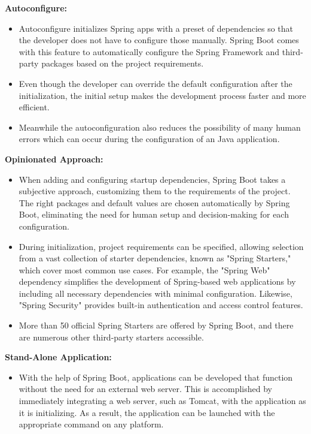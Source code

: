     \textbf{Autoconfigure:}
        \begin{itemize}
            \item Autoconfigure initializes Spring apps with a preset of dependencies so that the developer does not have to configure those manually. Spring Boot comes with this feature to automatically configure the Spring Framework and third-party packages based on the project requirements.
            \item Even though the developer can override the default configuration after the initialization, the initial setup makes the development process faster and more efficient.
            \item Meanwhile the autoconfiguration also reduces the possibility of many human errors which can occur during the configuration of an Java application.
        \end{itemize}
    \textbf{Opinionated Approach:}
        \begin{itemize}
            \item When adding and configuring startup dependencies, Spring Boot takes a subjective approach, customizing them to the requirements of the project. The right packages and default values are chosen automatically by Spring Boot, eliminating the need for human setup and decision-making for each configuration.

            \item During initialization, project requirements can be specified, allowing selection from a vast collection of starter dependencies, known as "Spring Starters," which cover most common use cases. For example, the "Spring Web" dependency simplifies the development of Spring-based web applications by including all necessary dependencies with minimal configuration. Likewise, "Spring Security" provides built-in authentication and access control features. 

            \item More than 50 official Spring Starters are offered by Spring Boot, and there are numerous other third-party starters accessible.


        \end{itemize}
    \textbf{Stand-Alone Application:}
        \begin{itemize}
            \item With the help of Spring Boot, applications can be developed that function without the need for an external web server. This is accomplished by immediately integrating a web server, such as Tomcat, with the application as it is initializing. As a result, the application can be launched with the appropriate command on any platform.
        \end{itemize}      
        \Autocite{Andi:SpringBoot1, Andi:SpringBoot2}          
    
